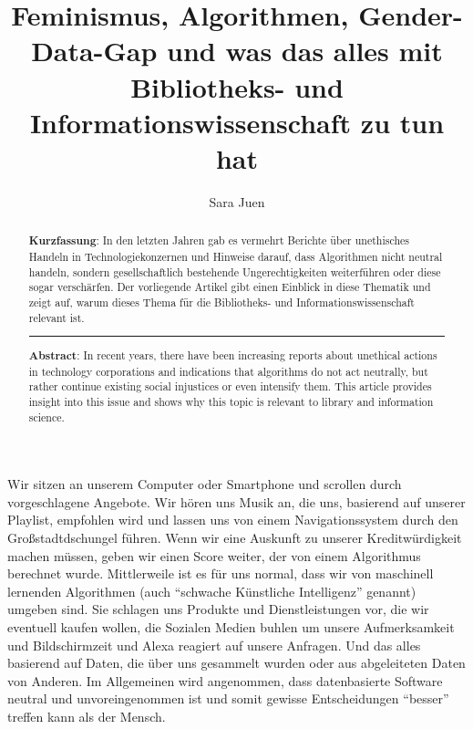 \documentclass[a4paper,
fontsize=11pt,
oneside,
numbers=noperiodatend,
parskip=half-,
bibliography=totoc,
final
]{scrartcl}
\title{\LARGE{Feminismus, Algorithmen, Gender-Data-Gap und was das alles mit Bibliotheks- und Informationswissenschaft zu tun hat}}%
\author{Sara Juen} %
\date{}
\begin{document}
\maketitle
\thispagestyle{fancyplain} 

\begin{abstract}
\noindent
\textbf{Kurzfassung}: In den letzten Jahren gab es vermehrt Berichte
über unethisches Handeln in Technologiekonzernen und Hinweise darauf,
dass Algorithmen nicht neutral handeln, sondern gesellschaftlich
bestehende Ungerechtigkeiten weiterführen oder diese sogar verschärfen.
Der vorliegende Artikel gibt einen Einblick in diese Thematik und zeigt
auf, warum dieses Thema für die Bibliotheks- und
Informationswissenschaft relevant ist.

\begin{center}\rule{0.5\linewidth}{0.5pt}\end{center}

\noindent\textbf{Abstract}: In recent years, there have been increasing reports
about unethical actions in technology corporations and indications that
algorithms do not act neutrally, but rather continue existing social
injustices or even intensify them. This article provides insight into
this issue and shows why this topic is relevant to library and
information science.
\end{abstract}

Wir sitzen an unserem Computer oder Smartphone und scrollen durch
vorgeschlagene Angebote. Wir hören uns Musik an, die uns, basierend auf
unserer Playlist, empfohlen wird und lassen uns von einem
Navigationssystem durch den Großstadtdschungel führen. Wenn wir eine
Auskunft zu unserer Kreditwürdigkeit machen müssen, geben wir einen
Score weiter, der von einem Algorithmus berechnet wurde. Mittlerweile
ist es für uns normal, dass wir von maschinell lernenden Algorithmen
(auch \enquote{schwache Künstliche Intelligenz} genannt) umgeben sind. Sie
schlagen uns Produkte und Dienstleistungen vor, die wir eventuell kaufen
wollen, die Sozialen Medien buhlen um unsere Aufmerksamkeit und
Bildschirmzeit und Alexa reagiert auf unsere Anfragen. Und das alles
basierend auf Daten, die über uns gesammelt wurden oder aus abgeleiteten
Daten von Anderen. Im Allgemeinen wird angenommen, dass datenbasierte
Software neutral und unvoreingenommen ist und somit gewisse
Entscheidungen \enquote{besser} treffen kann als der Mensch.
\end{document}
